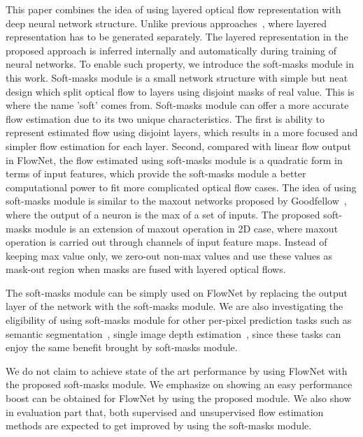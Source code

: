 \documentclass[10pt,twocolumn,letterpaper]{article}
\begin{document}
This paper combines the idea of using layered optical flow representation with deep neural network structure. Unlike previous approaches~\cite{yang2015dense}\cite{black1996estimating}\cite{ju1996skin}, where layered representation has to be generated separately. The layered representation in the proposed approach is inferred internally and automatically during training of neural networks. To enable such property, we introduce the soft-masks module in this work. Soft-masks module is a small network structure with simple but neat design which split optical flow to layers using disjoint masks of real value. This is where the name 'soft' comes from. Soft-masks module can offer a more accurate flow estimation due to its two unique characteristics. The first is ability to represent estimated flow using disjoint layers, which results in a more focused and simpler flow estimation for each layer. Second, compared with linear flow output in FlowNet, the flow estimated using soft-masks module is a quadratic form in terms of input features, which provide the soft-masks module a better computational power to fit more complicated optical flow cases. The idea of using soft-masks module is similar to the maxout networks proposed by Goodfellow~\cite{Goodfellow:2013:MN:3042817.3043084}, where the output of a neuron is the max of a set of inputs. The proposed soft-masks module is an extension of maxout operation in 2D case, where maxout operation is carried out through channels of input feature maps. Instead of keeping max value only, we zero-out non-max values and use these values as mask-out region when masks are fused with layered optical flows.

The soft-masks module can be simply used on FlowNet by replacing the output layer of the network with the soft-masks module. We are also investigating the eligibility of using soft-masks module for other per-pixel prediction tasks such as semantic segmentation~\cite{long2015fully}, single image depth estimation~\cite{eigen2014depth}, since these tasks can enjoy the same benefit brought by soft-masks module.

We do not claim to achieve state of the art performance by using FlowNet with the proposed soft-masks module. We emphasize on showing an easy performance boost can be obtained for FlowNet by using the proposed module. We also show in evaluation part that, both supervised and unsupervised flow estimation methods are expected to get improved by using the soft-masks module.
\end{document}
